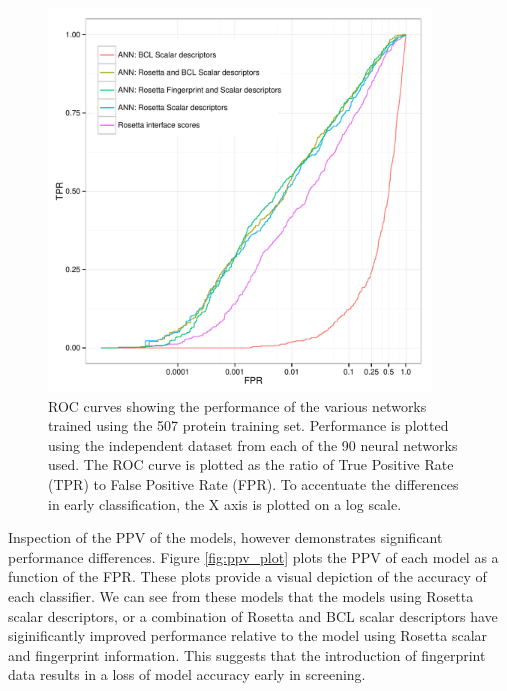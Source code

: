 \begin{figure}
\centering
\includegraphics[width=4in]{figures/hts/tpr_plot.pdf}
\caption{
ROC curves showing the performance of the various networks trained using the 507 protein training set.
Performance is plotted using the independent dataset from each of the 90 neural networks used.
The ROC curve is plotted as the ratio of True Positive Rate (TPR) to False Positive Rate (FPR).
To accentuate the differences in early classification, the X axis is plotted on a log scale.
}
\label{fig:roc_plot}
\end{figure}
\begin{table}
\scriptsize
\renewcommand{\tabcolsep}{0.09cm}
\centering

\caption{
ROC-AUC and average enrichment for the classification models being evaluated.
The Rosetta Interface Scores classifier uses only the sorted RosettaLigand interface scores for classification.
all "ANN" classifiers are constructed as neural nets using the specified descriptors.
ROC-AUC is the area under the ROC curve generated from each descriptor (Figure \ref{fig:roc_plot})
Average enrichment is the average enrichment within the first 1\% of the each dataset.
}
\label{table:ann_performance}
\end{table}

Inspection of the PPV of the models, however demonstrates significant performance differences.
Figure \ref{fig:ppv_plot} plots the PPV of each model as a function of the FPR.
These plots provide a visual depiction of the accuracy of each classifier.
We can see from these models that the models using Rosetta scalar descriptors, or a combination of Rosetta and BCL scalar descriptors have siginificantly improved performance relative to the model using Rosetta scalar and fingerprint information.
This suggests that the introduction of fingerprint data results in a loss of model accuracy early in screening.

